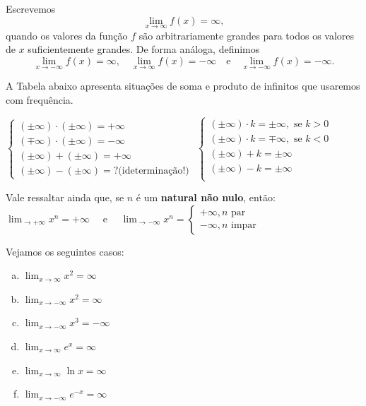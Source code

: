 \cleardoublepage\documentclass[../main.tex]{subfiles}
\begin{document}
Escrevemos
\begin{equation*}
  \lim_{x\to\infty} f(x)=\infty,
\end{equation*}
quando os valores da função $f$ são arbitrariamente grandes para todos os valores de $x$ suficientemente grandes. De forma análoga, definimos
\begin{equation*}
  \lim_{x\to -\infty} f(x)=\infty,\quad\lim_{x\to \infty} f(x)=-\infty\quad\text{e}\quad\lim_{x\to -\infty} f(x)=-\infty.
\end{equation*}

A Tabela abaixo apresenta situações de soma e produto de infinitos que usaremos com frequência.
\begin{framed}
$\left\{\begin{array}{l}
   (\pm\infty)\cdot (\pm\infty)=+\infty\\
    (\mp\infty)\cdot (\pm\infty)=-\infty   \\
     (\pm\infty)+ (\pm\infty)=+\infty\\
      (\pm\infty)- (\pm\infty)=? \textrm{(ideterminação!)}
\end{array}\right.$\hfill
$\left\{\begin{array}{l}
   (\pm\infty)\cdot k=\pm\infty, \textrm{ se } k>0\\
   (\pm\infty)\cdot k=\mp\infty, \textrm{ se } k<0\\
    (\pm\infty)+ k=\pm\infty\\
      (\pm\infty)- k=\pm\infty\\
\end{array}\right.$
\end{framed}
Vale ressaltar ainda que, se $n$ é um \textbf{natural não nulo}, então:\\
$\displaystyle\lim_{\to +\infty} x^n=+\infty\quad$ e $\quad\displaystyle\lim_{\to -\infty} x^n=\left\{\begin{array}{l}
  +\infty, n \textrm{ par}\\
     -\infty, n \textrm{ impar}
\end{array}\right.$

\begin{ex}
  Vejamos os seguintes casos:
  \begin{multicols}{2}
 \begin{enumerate}[a)]
  \item $\displaystyle\lim_{x\to\infty} x^2 = \infty$
  \item $\displaystyle\lim_{x\to -\infty} x^2 = \infty$
  \item $\displaystyle\lim_{x\to -\infty} x^3 = -\infty$
  \item $\displaystyle\lim_{x\to \infty} e^x = \infty$
  \item $\displaystyle\lim_{x\to \infty} \ln x = \infty$
  \item $\displaystyle\lim_{x\to -\infty} e^{-x} = \infty$
  \end{enumerate}
  \end{multicols}
  \end{ex}
  
\end{document}
